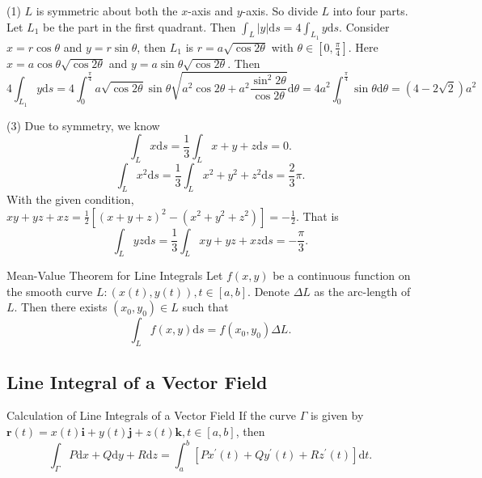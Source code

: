 \begin{solution}
  (1) $L$ is symmetric about both the $x$-axis and $y$-axis.
  So divide $L$ into four parts. Let $L_1$ be the part in the first quadrant.
  Then $\int_L|y|\mathrm{d}s = 4\int_{L_1}y \mathrm{d} s$.
  Consider $x = r \cos \theta$ and $y = r \sin \theta$, then $L_1$ is $r = a
  \sqrt{\cos 2\theta}$ with $\theta \in [0, \frac{\pi}{4}]$.
  Here $x = a \cos \theta \sqrt{\cos 2\theta}$ and $y = a \sin \theta \sqrt{\cos
  2\theta}$. Then
  \begin{equation}
    4\int_{L_1}y\mathrm{d} s
    = 4 \int_0^{\frac{\pi}{4}} a \sqrt{\cos 2\theta} \sin \theta \sqrt{a^2 \cos 2\theta + a^2 \frac{\sin^2 2\theta}{\cos 2\theta}} \mathrm{d} \theta
    = 4 a^2 \int_0^{\frac{\pi}{4}} \sin \theta \mathrm{d} \theta = (4 - 2 \sqrt{2})a^2
  \end{equation}

  (3) Due to symmetry, we know
  \begin{equation}
    \int_L x \mathrm{d} s = \frac{1}{3} \int_{L} x+y+z\mathrm{d} s = 0.
  \end{equation}
  \begin{equation}
    \int_Lx^2\mathrm{d} s = \frac{1}{3} \int_L x^2 + y^2 + z^2 \mathrm{d} s
    = \frac{2}{3}\pi.
  \end{equation}
  With the given condition,
  $xy + yz + xz = \frac{1}{2}\left[ (x+y+z)^2 - (x^2 + y^2 + z^2) \right] = - \frac{1}{2}$.
  That is
  \begin{equation}
    \int_L yz \mathrm{d} s = \frac{1}{3} \int_L xy + yz + xz \mathrm{d} s
    = - \frac{\pi}{3}.
  \end{equation}
\end{solution}

\begin{theorem}{Mean-Value Theorem for Line Integrals}{}
  Let $f(x, y)$ be a continuous function on the smooth curve
  $L: (x(t), y(t)), t \in [a, b]$.
  Denote $\Delta L$ as the arc-length of $L$.
  Then there exists $(x_0, y_0) \in L$ such that
  \begin{equation}
    \int_L f(x, y)\mathrm{d} s = f(x_0, y_0)\Delta L.
  \end{equation}
\end{theorem}

\subsection{Line Integral of a Vector Field}

\begin{proposition}{Calculation of Line Integrals of a Vector Field}{}
  If the curve $\Gamma$ is given by $\mathbf{r}(t) = x(t)\mathbf{i} +
  y(t)\mathbf{j} + z(t)\mathbf{k}, t \in [a, b]$,
  then
  \begin{equation}
    \int_{\Gamma}P \mathrm{d} x + Q\mathrm{d} y + R\mathrm{d} z
    = \int_a^b \left[ Px^{\prime}(t) + Qy^{\prime}(t) + Rz^{\prime}(t) \right]\mathrm{d} t.
  \end{equation}
\end{proposition}

